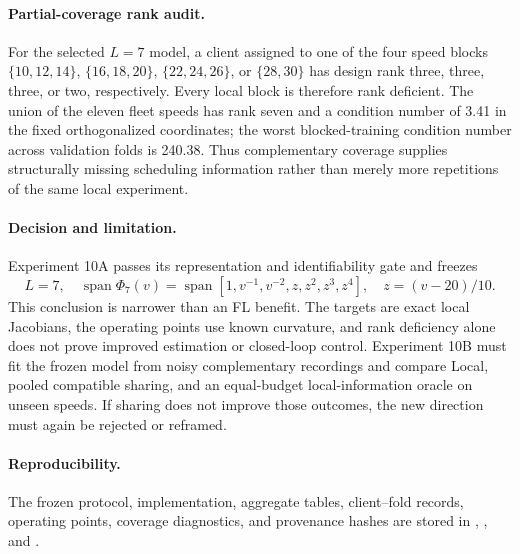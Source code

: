 \paragraph{Partial-coverage rank audit.}
For the selected $L=7$ model, a client assigned to one of the four speed blocks
$\{10,12,14\}$, $\{16,18,20\}$, $\{22,24,26\}$, or $\{28,30\}$ has design
rank three, three, three, or two, respectively. Every local block is therefore
rank deficient. The union of the eleven fleet speeds has rank seven and a
condition number of 3.41 in the fixed orthogonalized coordinates; the worst
blocked-training condition number across validation folds is 240.38.
Thus complementary coverage supplies structurally missing scheduling
information rather than merely more repetitions of the same local experiment.

\paragraph{Decision and limitation.}
Experiment 10A passes its representation and identifiability gate and freezes
\begin{equation}
 \boxed{L=7,\quad
 \operatorname{span}\Phi_7(v)=
 \operatorname{span}[1,v^{-1},v^{-2},z,z^2,z^3,z^4],\quad
 z=(v-20)/10.}
\end{equation}
This conclusion is narrower than an FL benefit. The targets are exact local
Jacobians, the operating points use known curvature, and rank deficiency alone
does not prove improved estimation or closed-loop control. Experiment 10B must
fit the frozen model from noisy complementary recordings and compare Local,
pooled compatible sharing, and an equal-budget local-information oracle on
unseen speeds. If sharing does not improve those outcomes, the new direction
must again be rejected or reframed.

\paragraph{Reproducibility.}
The frozen protocol, implementation, aggregate tables, client--fold records,
operating points, coverage diagnostics, and provenance hashes are stored in
,
, and
.
